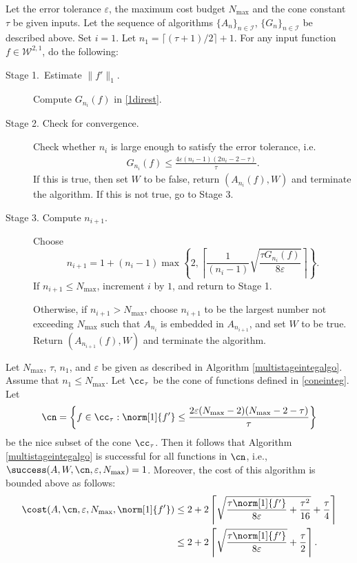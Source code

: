 \begin{algo} \label{multistageintegalgo}
Let the error tolerance $\varepsilon$, the maximum cost budget $N_{\text{max}}$ and the cone constant $\tau$ be given inputs. Let the sequence of algorithms $\{A_n\}_{n\in \mathcal{I}}$, $\{G_n\}_{n\in \mathcal{I}}$ be described above. Set $i=1$. Let $n_1=\lceil(\tau+1)/2\rceil+1$. For any input function $f\in \mathcal{W}^{2,1}$, do the following:
\begin{description}
\item[Stage 1.\ Estimate {$\|f'\|_{1}$}.] Compute $G_{n_i}(f)$ in \eqref{1direst}.

\item[Stage 2. Check for convergence.] Check whether $n_i$ is large enough to satisfy the error tolerance, i.e.
    \begin{align*}
     G_{n_i}(f) \le \frac{4\varepsilon(n_i-1)(2n_i-2 - \tau)}{\tau}.
    \end{align*}
    If this is true, then set $W$ to be false, return $(A_{n_i}(f),W)$ and terminate the algorithm. If this is not true, go to Stage 3.

\item[Stage 3. Compute $n_{i+1}$.] Choose
$$
n_{i+1}=1+ (n_i-1)\max\left\{2,\left\lceil\frac{1}{(n_i-1)}\sqrt{\frac{\tau G_{n_i}(f)}{8\varepsilon}}\right\rceil\right\}.
$$
If $n_{i+1} \le N_{\max}$, increment $i$ by $1$, and return to Stage 1.

Otherwise, if $n_{i+1} > N_{\max}$, choose $n_{i+1}$ to be the largest number not exceeding $N_{\max}$ such that $A_{n_{i}}$ is embedded in $A_{n_{i+1}}$, and set $W$ to be true. Return $(A_{n_{i+1}}(f),W)$ and terminate the algorithm.
\end{description}
\end{algo}

\begin{theorem} \label{multistageintegthm} Let  $N_{\max}$, $\tau$, $n_1$, and $\varepsilon$ be given as described in Algorithm \ref{multistageintegalgo}.  Assume that $n_1 \le N_{\max}$.  Let $\cc_\tau$ be the cone of functions defined in \eqref{coneinteg}.  Let
$$
\cn
= \left \{ f \in \cc_\tau : \norm[1]{f'} \le \frac{2\varepsilon (N_{\max}-2)(N_{\max}-2 -\tau)}{\tau} \right\}
$$
be the nice subset of the cone $\cc_\tau$.  Then it follows that Algorithm \ref{multistageintegalgo} is successful for all functions in $\cn$,  i.e.,  $\success(A,W,\cn,\varepsilon,N_{\max}) = 1$.  Moreover, the cost of this algorithm is bounded above as follows:
\begin{align*}
\cost(A,\cn,\varepsilon,N_{\max},\norm[1]{f'})
&\le 2+2 \left \lceil \sqrt{\frac{\tau \norm[1]{f'}}{8\varepsilon} + \frac{\tau^2 }{16}} + \frac{\tau}{4} \right\rceil \\
&\le 2+2 \left \lceil\sqrt{\frac{\tau \norm[1]{f'}}{8\varepsilon}} + \frac{\tau}{2} \right \rceil.
\end{align*}
\end{theorem}

